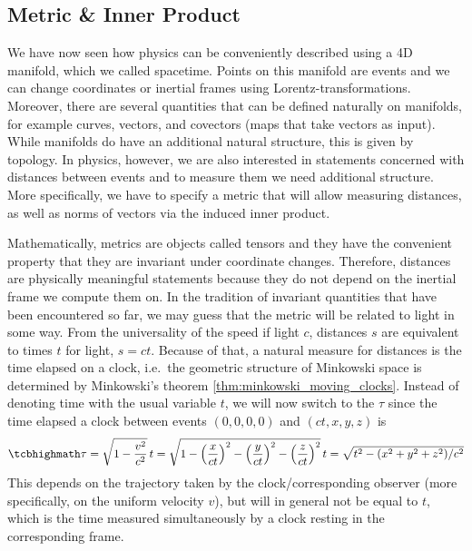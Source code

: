 		\subsection{Metric \& Inner Product}
We have now seen how physics can be conveniently described using a 4D manifold, which we called spacetime. Points on this manifold are events and we can change coordinates or inertial frames using Lorentz-transformations. Moreover, there are several quantities that can be defined naturally on manifolds, for example curves, vectors, and covectors (maps that take vectors as input). While manifolds do have an additional natural structure, this is given by topology. In physics, however, we are also interested in statements concerned with distances between events and to measure them we need additional structure. More specifically, we have to specify a metric that will allow measuring distances, as well as norms of vectors via the induced inner product.


Mathematically, metrics are objects called tensors and they have the convenient property that they are invariant under coordinate changes. Therefore, distances are physically meaningful statements because they do not depend on the inertial frame we compute them on. In the tradition of invariant quantities that have been encountered so far, we may guess that the metric will be related to light in some way. From the universality of the speed if light $c$, distances $s$ are equivalent to times $t$ for light, $s = c t$. Because of that, a natural measure for distances is the time elapsed on a clock, i.e.~the geometric structure of Minkowski space is determined by Minkowski's theorem \ref{thm:minkowski_moving_clocks}. Instead of denoting time with the usual variable $t$, we will now switch to the  $\tau$ since the time elapsed a clock between events $(0, 0, 0, 0)$ and $(ct, x, y, z)$ is
\begin{equation}\label{eq:proper_time_uniform}
\eqbox{
\tau = \sqrt{1 - \frac{v^2}{c^2}} \, t = \sqrt{1 - \qty(\frac{x}{ct})^2 - \qty(\frac{y}{ct})^2 - \qty(\frac{z}{ct})^2} \, t = \sqrt{t^2 - (x^2 + y^2 + z^2) / c^2}
}
\end{equation}
This depends on the trajectory taken by the clock/corresponding observer (more specifically, on the uniform velocity $v$), but will in general not be equal to $t$, which is the time measured simultaneously by a clock resting in the corresponding frame. 



